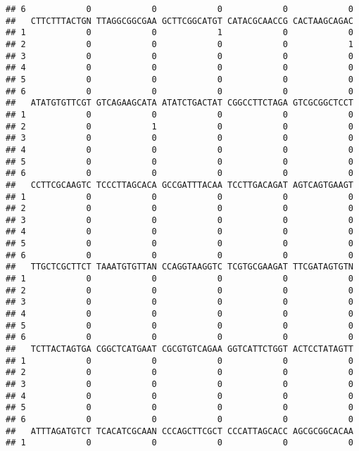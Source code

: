 \documentclass[]{article}
\begin{document}
\begin{verbatim}
## 6            0            0            0            0            0
##   CTTCTTTACTGN TTAGGCGGCGAA GCTTCGGCATGT CATACGCAACCG CACTAAGCAGAC
## 1            0            0            1            0            0
## 2            0            0            0            0            1
## 3            0            0            0            0            0
## 4            0            0            0            0            0
## 5            0            0            0            0            0
## 6            0            0            0            0            0
##   ATATGTGTTCGT GTCAGAAGCATA ATATCTGACTAT CGGCCTTCTAGA GTCGCGGCTCCT
## 1            0            0            0            0            0
## 2            0            1            0            0            0
## 3            0            0            0            0            0
## 4            0            0            0            0            0
## 5            0            0            0            0            0
## 6            0            0            0            0            0
##   CCTTCGCAAGTC TCCCTTAGCACA GCCGATTTACAA TCCTTGACAGAT AGTCAGTGAAGT
## 1            0            0            0            0            0
## 2            0            0            0            0            0
## 3            0            0            0            0            0
## 4            0            0            0            0            0
## 5            0            0            0            0            0
## 6            0            0            0            0            0
##   TTGCTCGCTTCT TAAATGTGTTAN CCAGGTAAGGTC TCGTGCGAAGAT TTCGATAGTGTN
## 1            0            0            0            0            0
## 2            0            0            0            0            0
## 3            0            0            0            0            0
## 4            0            0            0            0            0
## 5            0            0            0            0            0
## 6            0            0            0            0            0
##   TCTTACTAGTGA CGGCTCATGAAT CGCGTGTCAGAA GGTCATTCTGGT ACTCCTATAGTT
## 1            0            0            0            0            0
## 2            0            0            0            0            0
## 3            0            0            0            0            0
## 4            0            0            0            0            0
## 5            0            0            0            0            0
## 6            0            0            0            0            0
##   ATTTAGATGTCT TCACATCGCAAN CCCAGCTTCGCT CCCATTAGCACC AGCGCGGCACAA
## 1            0            0            0            0            0

\end{verbatim}
\end{document}
